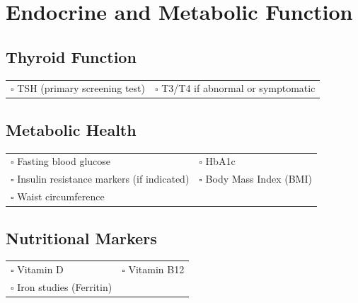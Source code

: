 
\section{Endocrine and Metabolic Function}
\label{sec:metabolic}

\subsection{Thyroid Function}

\begin{tabular}{p{9cm} p{8cm}}
$\square$ TSH (primary screening test) & $\square$ T3/T4 if abnormal or symptomatic \\ 
\end{tabular}

\subsection{Metabolic Health}

\begin{tabular}{p{9cm} p{8cm}}
$\square$ Fasting blood glucose & $\square$ HbA1c \\ 
$\square$ Insulin resistance markers (if indicated) & $\square$ Body Mass Index (BMI)\\
$\square$ Waist circumference & \\ 
\end{tabular}

\subsection{Nutritional Markers}

\begin{tabular}{p{9cm} p{8cm}}
$\square$ Vitamin D & $\square$ Vitamin B12  \\ 
$\square$ Iron studies (Ferritin) & \\ 
\end{tabular}

